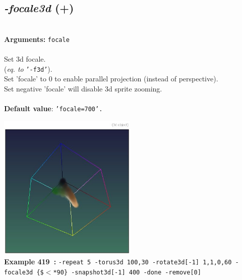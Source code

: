 \documentclass[a4paper,11pt,twoside]{book}
\begin{document}
\subsection{\emph{-focale3d} (+)}\vspace*{-0.5em}
~\\\textbf{Arguments: } 
{\small \texttt{focale}}\\~\\
Set 3d focale.
~\\(\emph{eq. to} {\small \texttt{'-f3d'}}).
~\\Set 'focale' to 0 to enable parallel projection (instead of perspective).
~\\Set negative 'focale' will disable 3d sprite zooming.
~\\~\\\textbf{Default value}: {\small \texttt{'focale=700'.}}
\begin{center}\includegraphics[keepaspectratio=true,height=7cm,width=\textwidth]{img/gmic_def419.jpg}\\
{\footnotesize \textbf{Example 419~:} \texttt{-repeat 5 -torus3d 100,30 -rotate3d[-1] 1,1,0,60 -focale3d \{\$$<$*90\} -snapshot3d[-1] 400 -done -remove[0]}}
\end{center}
\end{document}
